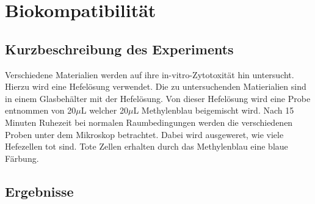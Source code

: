 \section{Biokompatibilität}

\subsection{Kurzbeschreibung des Experiments}
Verschiedene Materialien werden auf ihre in-vitro-Zytotoxität hin untersucht.
Hierzu wird eine Hefelösung verwendet. Die zu untersuchenden Matierialien
sind in einem Glasbehälter mit der Hefelösung. Von dieser Hefelösung wird eine
Probe entnommen von 20$\mu$L welcher 20$\mu$L Methylenblau beigemischt wird.
Nach 15 Minuten Ruhezeit bei normalen Raumbedingungen werden die verschiedenen
Proben unter dem Mikroskop betrachtet. Dabei wird ausgeweret, wie viele
Hefezellen tot sind. Tote Zellen erhalten durch das Methylenblau eine blaue
Färbung.

\subsection{Ergebnisse}


